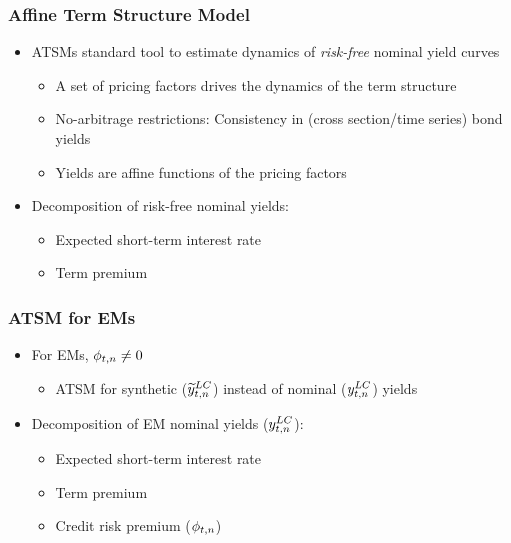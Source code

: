 \documentclass[12pt, aspectratio=169, xcolor=dvipsnames]{beamer} 			         %
\begin{document}
\begin{frame}
	\frametitle{Affine Term Structure Model}
	\begin{itemize}
		\item ATSMs standard tool to estimate dynamics of \textit{risk-free} \alert{nominal} yield curves
		\begin{itemize}
			\item A set of pricing factors drives the dynamics of the term structure
			\item No-arbitrage restrictions: Consistency in (cross section/time series) bond yields
			\item Yields are affine functions of the pricing factors
		\end{itemize}
		\item Decomposition of risk-free nominal yields:
		\begin{itemize}
			\item Expected short-term interest rate
			\item Term premium
		\end{itemize}
	\end{itemize}
\end{frame}

\begin{frame}
	\frametitle{ATSM for EMs}
	\begin{itemize}
		\item For EMs, $\phi_{t,n} \neq 0$ \citep{DuSchreger:2016JoF}
		\begin{itemize}
			\item ATSM for synthetic ($\widetilde{y}_{t,n} ^{LC}$) instead of nominal ($y_{t,n} ^{LC}$) yields
		\end{itemize}
		\item Decomposition of EM nominal yields ($y_{t,n} ^{LC}$):
		\begin{itemize}
			\item Expected short-term interest rate
			\item Term premium
			\item Credit risk premium ($\phi_{t,n}$)
		\end{itemize}
	\end{itemize}
\end{frame}
\end{document}
